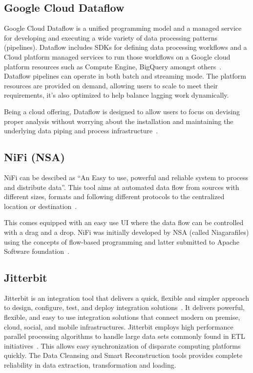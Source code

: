     \pv

\subsection{Google Cloud Dataflow \vc}
    
Google Cloud Dataflow is a unified programming model and a managed
service for developing and executing a wide variety of data processing
patterns (pipelines). Dataflow includes SDKs for defining data
processing workflows and a Cloud platform managed services to run
those workflows on a Google cloud platform resources such as Compute
Engine, BigQuery amongst others~\cite{www-Dataflow}. Dataflow
pipelines can operate in both batch and streaming mode. The platform
resources are provided on demand, allowing users to scale to meet
their requirements, it's also optimized to help balance lagging work
dynamically.

Being a cloud offering, Dataflow is designed to allow users to focus
on devising proper analysis without worrying about the installation
and maintaining the underlying data piping and process
infrastructure~\cite{www-GoogleLiveStream}.

    \pv
    
\subsection{NiFi (NSA)}

NiFi can be descibed as ``An Easy to use, powerful and reliable system
to process and distribute data''\cite{www-nifi}.  This tool aims at
automated data flow from sources with different sizes, formats and
following different protocols to the centralized location or
destination~\cite{www-hortanworks}.
    
This comes equipped with an easy use UI where the data flow can be
controlled with a drag and a drop.  NiFi was initially developed by
NSA (called Niagarafiles) using the concepts of flow-based programming
and latter submitted to Apache Software foundation~\cite{www-forbes}.


    \pv

\subsection{Jitterbit}

Jitterbit is an integration tool that delivers a quick, flexible and
simpler approach to design, configure, test, and deploy integration
solutions~\cite{datasheet}.  It delivers powerful, flexible, and easy
to use integration solutions that connect modern on premise, cloud,
social, and mobile infrastructures. Jitterbit employs high performance
parallel processing algorithms to handle large data sets commonly
found in ETL initiatives~\cite{www-jitetl}. This allows easy
synchronization of disparate computing platforms quickly. The Data
Cleansing and Smart Reconstruction tools provides complete reliability
in data extraction, transformation and loading.

